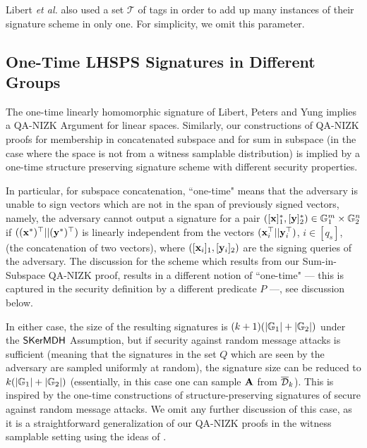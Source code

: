 Libert \textit{et al.} also used a set $\mathcal{T}$ of tags in order to add up many instances of their signature scheme
in only one. For simplicity, we omit this parameter.


\subsection{One-Time LHSPS Signatures in Different Groups} \label{sec:newhomtwogroups}

The one-time linearly homomorphic signature of Libert, Peters and Yung \cite{EC:LPJY14}  implies a QA-NIZK Argument for linear spaces. Similarly, our constructions of QA-NIZK proofs for membership in concatenated subspace and for sum in subspace (in the case where the space is not from a witness samplable distribution) is implied by a one-time structure preserving signature scheme with different security properties. 

In particular, for subspace concatenation, ``one-time" means that the adversary is unable to sign vectors which are not in the span of previously signed vectors, namely,
the adversary cannot output a signature for a pair
$([\mathbf{x}]_1^*,[\mathbf{y}]_2^*) \in \mathbb{G}_1^{m} \times \mathbb{G}_2^{n}$ if $((\mathbf{x}^*)^{\top}||(\mathbf{y}^*)^{\top})$ is
linearly independent from the 
vectors $(\mathbf{x}_i^{\top}||\mathbf{y}_i^{\top})$, $i \in [q_s]$, (the concatenation of two vectors), where $([\mathbf{x}_i]_1,[\mathbf{y}_i]_2)$ are the signing queries of the adversary. The discussion for the scheme which results from our 
Sum-in-Subspace QA-NIZK proof, results in a different notion of ``one-time" --- this is captured in the security definition by a different predicate $P$ ---, see discussion below. 

In either case, the size of the resulting signatures is $(k+1)(|\mathbb{G}_1|+|\mathbb{G}_2|)$ under the $\mathsf{SKerMDH}$ Assumption, but if security against random message attacks is sufficient (meaning that the signatures in the set $Q$ which are seen by the adversary are sampled uniformly at random), the signature size can be reduced to $k(|\mathbb{G}_1|+|\mathbb{G}_2|)$ (essentially, in this case one can sample $\mathbf{{A}}$ from $\overline{\mathcal{D}}_k$). This is inspired by the one-time constructions of structure-preserving signatures of \cite{C:KilPanWee15} secure against random message attacks. 
 We omit any further discussion of this case, as it is a straightforward generalization of our QA-NIZK proofs in the witness samplable setting using the ideas of \cite{C:KilPanWee15}. 




